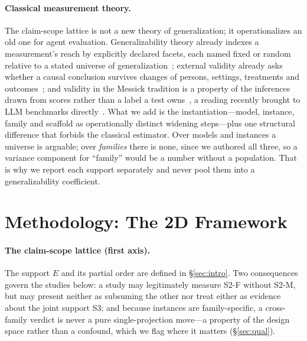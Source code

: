 \documentclass{article}
\begin{document}
\paragraph{Classical measurement theory.} The claim-scope lattice is not a new theory of generalization; it operationalizes an old one for agent evaluation. Generalizability theory already indexes a measurement's reach by explicitly declared facets, each named fixed or random relative to a stated universe of generalization~\citep{gtheory}; external validity already asks whether a causal conclusion survives changes of persons, settings, treatments and outcomes~\citep{shadish}; and validity in the Messick tradition is a property of the inferences drawn from scores rather than a label a test owns~\citep{messick}, a reading recently brought to LLM benchmarks directly~\citep{benchconstruct}. What we add is the instantiation---model, instance, family and scaffold as operationally distinct widening steps---plus one structural difference that forbids the classical estimator. Over models and instances a universe is arguable; over \emph{families} there is none, since we authored all three, so a variance component for ``family'' would be a number without a population. That is why we report each support separately and never pool them into a generalizability coefficient.

\section{Methodology: The 2D Framework}
\paragraph{The claim-scope lattice (first axis).} The support $E$ and its partial order are defined in \S\ref{sec:intro}. Two consequences govern the studies below: a study may legitimately measure S2-F without S2-M, but may present neither as subsuming the other nor treat either as evidence about the joint support S3; and because instances are family-specific, a cross-family verdict is never a pure single-projection move---a property of the design space rather than a confound, which we flag where it matters (\S\ref{sec:qual}).
\end{document}
